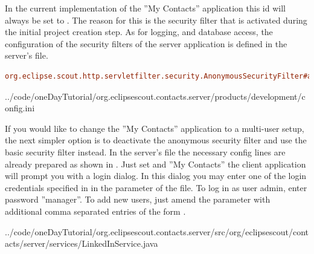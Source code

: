 \documentclass[a4paper,10pt,twoside]{book}
\begin{document}
In the current implementation of the ''My Contacts'' application this id will always be set to . 
The reason for this is the  security filter that is activated during the initial project creation step. 
As for logging, and database access, the configuration of the security filters of the server application is defined in the server's  file.

\begin{lstlisting}[backgroundcolor=\color{white},language=ini]
org.eclipse.scout.http.servletfilter.security.AnonymousSecurityFilter#active=true
\end{lstlisting}


{../code/oneDayTutorial/org.eclipsescout.contacts.server/products/development/config.ini}

If you would like to change the ''My Contacts'' application to a multi-user setup, the next simpler option is to deactivate the anonymous security filter and use the basic security filter instead. 
In the server's  file the necessary config lines are already prepared as shown in . 
Just set  and ''My Contacts'' the client application will prompt you with a login dialog. 
In this dialog you may enter one of the login credentials specified in in the  parameter of the  file. 
To log in as user admin, enter password ''manager''. 
To add new users, just amend the  parameter with additional comma separated entries of the form .


{../code/oneDayTutorial/org.eclipsescout.contacts.server/src/org/eclipsescout/contacts/server/services/LinkedInService.java}
\end{document}
